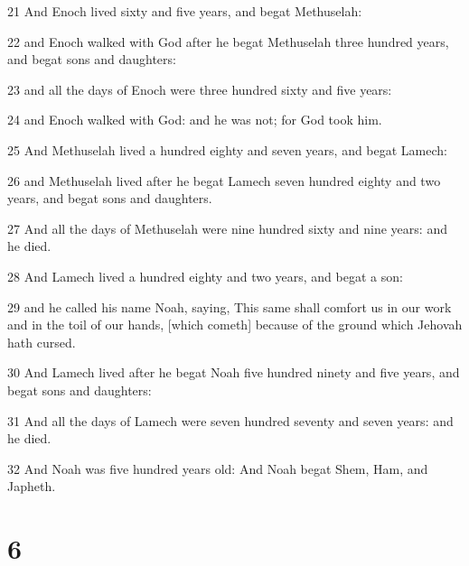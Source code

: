 \par 21 And Enoch lived sixty and five years, and begat Methuselah:
\par 22 and Enoch walked with God after he begat Methuselah three hundred years, and begat sons and daughters:
\par 23 and all the days of Enoch were three hundred sixty and five years:
\par 24 and Enoch walked with God: and he was not; for God took him.
\par 25 And Methuselah lived a hundred eighty and seven years, and begat Lamech:
\par 26 and Methuselah lived after he begat Lamech seven hundred eighty and two years, and begat sons and daughters.
\par 27 And all the days of Methuselah were nine hundred sixty and nine years: and he died.
\par 28 And Lamech lived a hundred eighty and two years, and begat a son:
\par 29 and he called his name Noah, saying, This same shall comfort us in our work and in the toil of our hands, [which cometh] because of the ground which Jehovah hath cursed.
\par 30 And Lamech lived after he begat Noah five hundred ninety and five years, and begat sons and daughters:
\par 31 And all the days of Lamech were seven hundred seventy and seven years: and he died.
\par 32 And Noah was five hundred years old: And Noah begat Shem, Ham, and Japheth.

\chapter{6}


